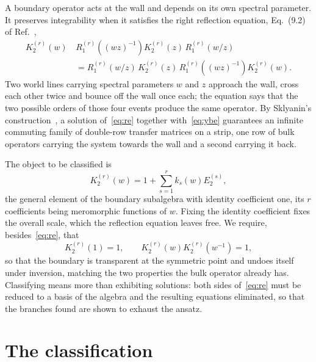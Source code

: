 \documentclass[
  aps,pre,
  reprint,
  superscriptaddress,
  amsmath,amssymb,
  floatfix
]{revtex4-2}
\theoremstyle{plain}
\theoremstyle{definition}
\theoremstyle{remark}
\begin{document}
A boundary operator acts at the wall and depends on its own spectral parameter.
It preserves integrability when it satisfies the right reflection equation,
Eq.~(9.2) of Ref.~\cite{shigechi2025fuss},
\begin{equation}
  \begin{split}
  K_2^{(r)}(w)\,&R_1^{(r)}\!\left((wz)^{-1}\right)
  K_2^{(r)}(z)\,R_1^{(r)}(w/z)\\
  &=R_1^{(r)}(w/z)\,K_2^{(r)}(z)\,
  R_1^{(r)}\!\left((wz)^{-1}\right)K_2^{(r)}(w).
  \end{split}
  \label{eq:re}
\end{equation}
Two world lines carrying spectral parameters $w$ and $z$ approach the wall,
cross each other twice and bounce off the wall once each; the equation says
that the two possible orders of those four events produce the same operator.
By Sklyanin's construction~\cite{sklyanin1988boundary}, a solution
of~\eqref{eq:re} together with~\eqref{eq:ybe} guarantees an infinite commuting
family of double-row transfer matrices on a strip, one row of bulk operators
carrying the system towards the wall and a second carrying it back.

The object to be classified is
\begin{equation}
  K_2^{(r)}(w)=1+\sum_{s=1}^{r}k_s(w)E_2^{(s)} ,
  \label{eq:ansatz}
\end{equation}
the general element of the boundary subalgebra with identity coefficient one,
its $r$ coefficients being meromorphic functions of $w$. Fixing the identity
coefficient fixes the overall scale, which the reflection equation leaves free.
We require, besides~\eqref{eq:re}, that
\begin{equation}
  K_2^{(r)}(1)=1,\qquad
  K_2^{(r)}(w)K_2^{(r)}(w^{-1})=1 ,
  \label{eq:conditions}
\end{equation}
so that the boundary is transparent at the symmetric point and undoes itself
under inversion, matching the two properties the bulk operator already has.
Classifying means more than exhibiting solutions: both sides of~\eqref{eq:re}
must be reduced to a basis of the algebra and the resulting equations
eliminated, so that the branches found are shown to exhaust the ansatz.

\section{The classification}
\label{sec:theorem}
\end{document}
